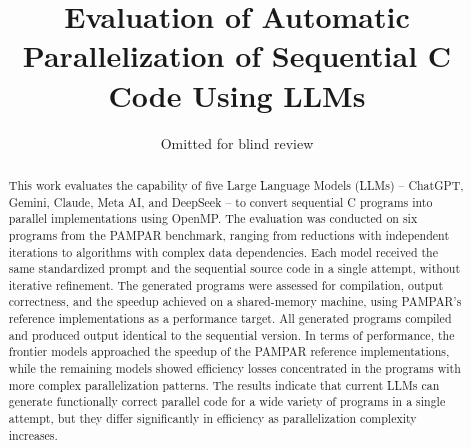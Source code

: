\documentclass[conference]{IEEEtran}
\begin{document}
    
\title{Evaluation of Automatic Parallelization of Sequential C Code Using LLMs}

\author{Omitted for blind review}

\maketitle

\begin{abstract}
This work evaluates the capability of five Large Language Models (LLMs) -- ChatGPT, Gemini, Claude, Meta AI, and DeepSeek -- to convert sequential C programs into parallel implementations using OpenMP. 
The evaluation was conducted on six programs from the PAMPAR benchmark, ranging from reductions with independent iterations to algorithms with complex data dependencies. 
Each model received the same standardized prompt and the sequential source code in a single attempt, without iterative refinement. 
The generated programs were assessed for compilation, output correctness, and the speedup achieved on a shared-memory machine, using PAMPAR's reference implementations as a performance target. 
All generated programs compiled and produced output identical to the sequential version. 
In terms of performance, the frontier models approached the speedup of the PAMPAR reference implementations, while the remaining models showed efficiency losses concentrated in the programs with more complex parallelization patterns. 
The results indicate that current LLMs can generate functionally correct parallel code for a wide variety of programs in a single attempt, but they differ significantly in efficiency as parallelization complexity increases. 
\end{abstract}
\end{document}
